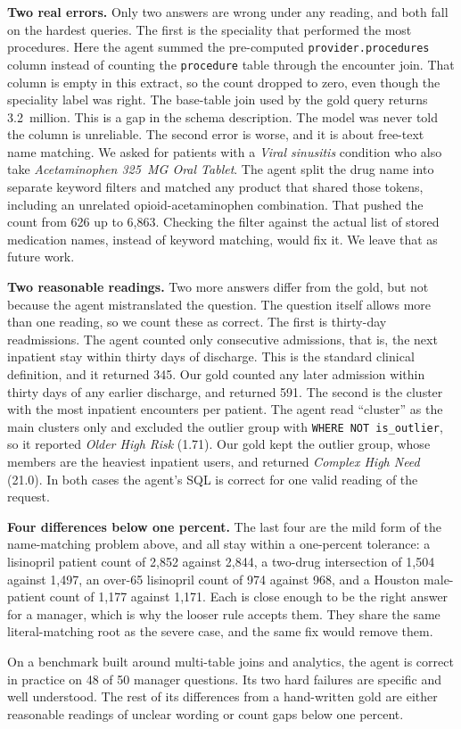\textbf{Two real errors.} Only two answers are wrong under any reading, and both fall on the hardest queries. The first is the speciality that performed the most procedures. Here the agent summed the pre-computed \texttt{provider.procedures} column instead of counting the \texttt{procedure} table through the encounter join. That column is empty in this extract, so the count dropped to zero, even though the speciality label was right. The base-table join used by the gold query returns 3.2~million. This is a gap in the schema description. The model was never told the column is unreliable. The second error is worse, and it is about free-text name matching. We asked for patients with a \emph{Viral sinusitis} condition who also take \emph{Acetaminophen 325~MG Oral Tablet}. The agent split the drug name into separate keyword filters and matched any product that shared those tokens, including an unrelated opioid-acetaminophen combination. That pushed the count from 626 up to 6{,}863. Checking the filter against the actual list of stored medication names, instead of keyword matching, would fix it. We leave that as future work.

\textbf{Two reasonable readings.} Two more answers differ from the gold, but not because the agent mistranslated the question. The question itself allows more than one reading, so we count these as correct. The first is thirty-day readmissions. The agent counted only consecutive admissions, that is, the next inpatient stay within thirty days of discharge. This is the standard clinical definition, and it returned 345. Our gold counted any later admission within thirty days of any earlier discharge, and returned 591. The second is the cluster with the most inpatient encounters per patient. The agent read ``cluster'' as the main clusters only and excluded the outlier group with \texttt{WHERE NOT is\_outlier}, so it reported \emph{Older High Risk} (1.71). Our gold kept the outlier group, whose members are the heaviest inpatient users, and returned \emph{Complex High Need} (21.0). In both cases the agent's SQL is correct for one valid reading of the request.

\textbf{Four differences below one percent.} The last four are the mild form of the name-matching problem above, and all stay within a one-percent tolerance: a lisinopril patient count of 2{,}852 against 2{,}844, a two-drug intersection of 1{,}504 against 1{,}497, an over-65 lisinopril count of 974 against 968, and a Houston male-patient count of 1{,}177 against 1{,}171. Each is close enough to be the right answer for a manager, which is why the looser rule accepts them. They share the same literal-matching root as the severe case, and the same fix would remove them.

On a benchmark built around multi-table joins and analytics, the agent is correct in practice on 48 of 50 manager questions. Its two hard failures are specific and well understood. The rest of its differences from a hand-written gold are either reasonable readings of unclear wording or count gaps below one percent.